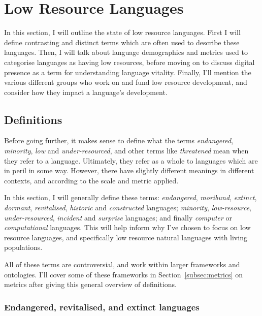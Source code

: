 \section{Low Resource Languages}
\label{sec:endlang}

In this section, I will outline the state of low resource languages. First I will define contrasting and distinct terms which are often used to describe these languages. Then, I will talk about language demographics and metrics used to categorise languages as having low resources, before moving on to discuss digital presence as a term for understanding language vitality. Finally, I'll mention the various different groups who work on and fund low resource development, and consider how they impact a language's development.


\subsection{Definitions}

Before going further, it makes sense to define what the terms \emph{endangered}, \emph{minority}, \emph{low} and \emph{under-resourced}, and other terms like \emph{threatened} mean when they refer to a language. Ultimately, they refer as a whole to languages which are in peril in some way. However, there have slightly different meanings in different contexts, and according to the scale and metric applied.

In this section, I will generally define these terms: \textit{endangered}, \textit{moribund}, \textit{extinct}, \textit{dormant}, \textit{revitalised}, \textit{historic} and \textit{constructed} languages; \textit{minority}, \textit{low-resource}, \textit{under-resourced}, \textit{incident} and \textit{surprise} languages; and finally \textit{computer} or \textit{computational} languages. This will help inform why I've chosen to focus on low resource languages, and specifically low resource natural languages with living populations.

All of these terms are controversial, and work within larger frameworks and ontologies. I'll cover some of these frameworks in Section~\ref{subsec:metrics} on metrics after giving this general overview of definitions.

\subsubsection{Endangered, revitalised, and extinct languages}

